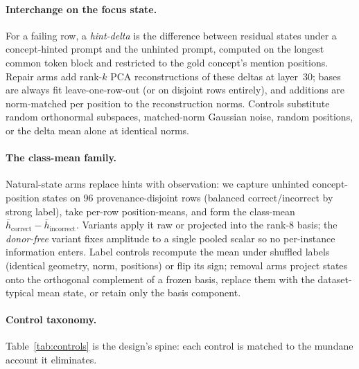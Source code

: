 \documentclass{article} %
\begin{document}
\paragraph{Interchange on the focus state.} For a failing row, a
\emph{hint-delta} is the difference between residual states under a
concept-hinted prompt and the unhinted prompt, computed on the longest
common token block and restricted to the gold concept's mention
positions. Repair arms add rank-$k$ PCA reconstructions of these
deltas at layer~30; bases are always fit leave-one-row-out (or on
disjoint rows entirely), and additions are norm-matched per position to
the reconstruction norms. Controls substitute random orthonormal
subspaces, matched-norm Gaussian noise, random positions, or the delta
mean alone at identical norms.

\paragraph{The class-mean family.} Natural-state arms replace hints
with observation: we capture unhinted concept-position states on 96
provenance-disjoint rows (balanced correct/incorrect by strong label),
take per-row position-means, and form the class-mean
$\bar h_{\text{correct}} - \bar h_{\text{incorrect}}$. Variants apply
it raw or projected into the rank-8 basis; the \emph{donor-free}
variant fixes amplitude to a single pooled scalar so no per-instance
information enters. Label controls recompute the mean under shuffled
labels (identical geometry, norm, positions) or flip its sign; removal
arms project states onto the orthogonal complement of a frozen basis,
replace them with the dataset-typical mean state, or retain only the
basis component.

\paragraph{Control taxonomy.} Table~\ref{tab:controls} is the design's
spine: each control is matched to the mundane account it eliminates.
\end{document}
